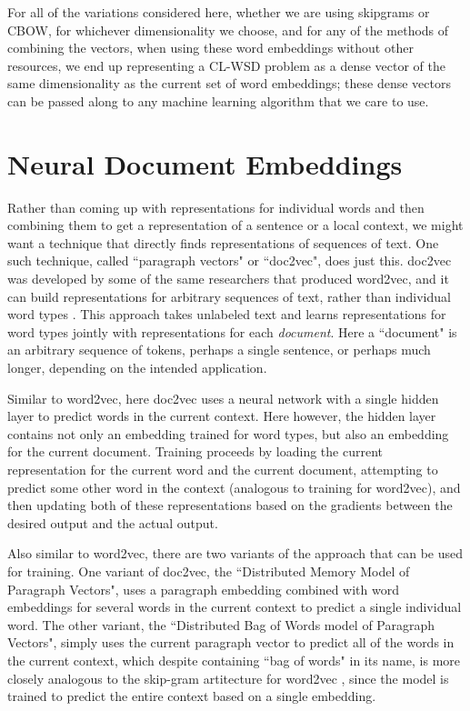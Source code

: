For all of the variations considered here, whether we are using skipgrams or
CBOW, for whichever dimensionality we choose, and for any of the methods of
combining the vectors, when using these word embeddings without other
resources, we end up representing a CL-WSD problem as a dense vector
of the same dimensionality as the current set of word embeddings;
these dense vectors can be passed along to any machine learning algorithm
that we care to use.

\section{Neural Document Embeddings}
Rather than coming up with representations for individual words and then
combining them to get a representation of a sentence or a local context, we
might want a technique that directly finds representations of sequences of
text. One such technique, called ``paragraph vectors" or ``doc2vec", does just
this. doc2vec was developed by some of the same researchers that produced
word2vec, and it can build representations for arbitrary sequences of text,
rather than individual word types
\cite{dai-document-embedding-2015,quocle-distributed-representations-2014}.
This approach takes unlabeled text and learns representations for word types
jointly with representations for each \emph{document}. Here a ``document" is an
arbitrary sequence of tokens, perhaps a single sentence, or perhaps much
longer, depending on the intended application.

Similar to word2vec, here doc2vec uses a neural network with a single hidden
layer to predict words in the current context. Here however, the hidden layer
contains not only an embedding trained for word types, but also an embedding
for the current document. Training proceeds by loading the current
representation for the current word and the current document, attempting to
predict some other word in the context (analogous to training for word2vec),
and then updating both of these representations based on the gradients between
the desired output and the actual output. 

Also similar to word2vec, there are two variants of the approach that can be
used for training. One variant of doc2vec, the ``Distributed Memory Model of
Paragraph Vectors", uses a paragraph embedding combined with word embeddings
for several words in the current context to predict a single individual word.
The other variant, the ``Distributed Bag of Words model of Paragraph Vectors",
simply uses the current paragraph vector to predict all of the words in the
current context, which despite containing ``bag of words" in its name, is more
closely analogous to the skip-gram artitecture for word2vec
\cite{quocle-distributed-representations-2014}, since the model is trained to
predict the entire context based on a single embedding.

